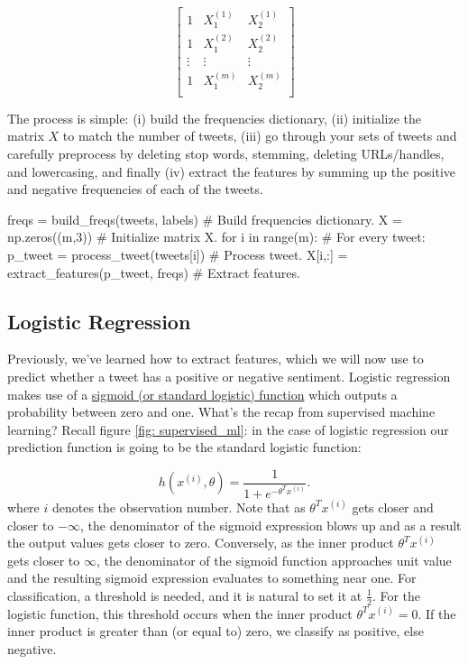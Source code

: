 \documentclass[12pt]{article}
\begin{document}
\begin{equation*}
  \begin{bmatrix}
    1 & X_1^{(1)} & X_2^{(1)} \\
    1 & X_1^{(2)} & X_2^{(2)} \\
    \vdots & \vdots & \vdots \\
    1 & X_1^{(m)} & X_2^{(m)} \\
  \end{bmatrix}
\end{equation*}

The process is simple: (i) build the frequencies dictionary, (ii) initialize the matrix $X$ to match the number of tweets, (iii) go through your sets of tweets and carefully preprocess by deleting stop words, stemming, deleting URLs/handles, and lowercasing, and finally (iv) extract the features by summing up the positive and negative frequencies of each of the tweets.

\begin{python}
freqs = build_freqs(tweets, labels)          # Build frequencies dictionary.
X = np.zeros((m,3))                          # Initialize matrix X.
for i in range(m):                           # For every tweet:
  p_tweet = process_tweet(tweets[i])         #   Process tweet.
  X[i,:] = extract_features(p_tweet, freqs)  #   Extract features.
\end{python}

\subsection{Logistic Regression} Previously, we've learned how to extract features, which we will now use to predict whether a tweet has a positive or negative sentiment. Logistic regression makes use of a \href{https://en.wikipedia.org/wiki/Logistic_function#Mathematical_properties}{sigmoid (or standard logistic) function} which outputs a probability between zero and one. What's the recap from supervised machine learning? Recall figure \ref{fig: supervised_ml}: in the case of logistic regression our prediction function is going to be the standard logistic function:

\[
  h(x^{(i)}, \theta) = \frac{1}{1 + e^{-\theta^T x^{(i)}}}.
\]
where $i$ denotes the observation number. Note that as $\theta^T x^{(i)}$ gets closer and closer to $-\infty$, the denominator of the sigmoid expression blows up and as a result the output values gets closer to zero. Conversely, as the inner product $\theta^T x^{(i)}$ gets closer to $\infty$, the denominator of the sigmoid function approaches unit value and the resulting sigmoid expression evaluates to something near one.
For classification, a threshold is needed, and it is natural to set it at $\frac{1}{2}$. For the logistic function, this threshold occurs when the inner product $\theta^T x^{(i)} = 0$. If the inner product is greater than (or equal to) zero, we classify as positive, else negative.
\end{document}
